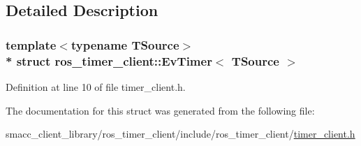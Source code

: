 \subsection{Detailed Description}
\subsubsection*{template$<$typename T\+Source$>$\\*
struct ros\+\_\+timer\+\_\+client\+::\+Ev\+Timer$<$ T\+Source $>$}



Definition at line 10 of file timer\+\_\+client.\+h.



The documentation for this struct was generated from the following file\+:\begin{DoxyCompactItemize}
\item 
smacc\+\_\+client\+\_\+library/ros\+\_\+timer\+\_\+client/include/ros\+\_\+timer\+\_\+client/\hyperlink{timer__client_8h}{timer\+\_\+client.\+h}\end{DoxyCompactItemize}
